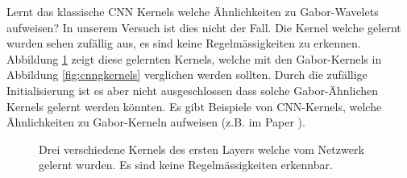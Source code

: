 Lernt das klassische CNN Kernels welche Ähnlichkeiten zu Gabor-Wavelets aufweisen?
In unserem Versuch ist dies nicht der Fall.
Die Kernel welche gelernt wurden sehen zufällig aus, es sind keine Regelmässigkeiten zu erkennen.
Abbildung \ref{fig:cnnkernels} zeigt diese gelernten Kernels, welche mit den Gabor-Kernels in Abbildung \ref{fig:cnngkernels} verglichen werden sollten.
Durch die zufällige Initialisierung ist es aber nicht ausgeschlossen dass solche Gabor-Ähnlichen Kernels gelernt werden könnten.
Es gibt Beispiele von CNN-Kernels, welche Ähnlichkeiten zu Gabor-Kerneln aufweisen (z.B. im Paper \cite{paper:cifar10}).

\begin{figure}
	\centering
	\caption{Drei verschiedene Kernels des ersten Layers welche vom Netzwerk gelernt wurden. Es sind keine Regelmässigkeiten erkennbar.}
	\label{fig:cnnkernels}
\end{figure}

